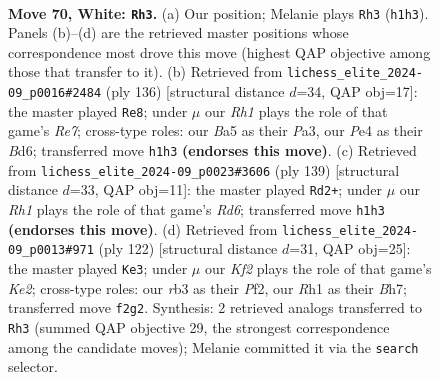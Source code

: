 \documentclass[11pt]{article}
\begin{document}
\clearpage

\begin{figure}[p]\centering
\begin{subfigure}{0.46\textwidth}\centering
\resizebox{\linewidth}{!}{%
\newchessgame
\chessboard[
  setfen={8/6k1/B2p3p/B3p1b1/n3P2p/1r3P2/5K2/7R w - - 9 70},
  showmover=false,
  pgfstyle=straightmove, color=movearrow, markmove={h1-h3}
]}
\caption{}
\end{subfigure}\hfill
\begin{subfigure}{0.46\textwidth}\centering
\resizebox{\linewidth}{!}{%
\newchessgame
\chessboard[
  setfen={8/4R3/3B1pk1/3p4/p2P3r/Pb1K4/8/8 w - - 32 69},
  showmover=false,
  pgfstyle=straightmove, color=movearrow, markmove={e7-e8}
]}
\caption{}
\end{subfigure}
\\[4pt]
\begin{subfigure}{0.46\textwidth}\centering
\resizebox{\linewidth}{!}{%
\newchessgame
\chessboard[
  setfen={8/6pk/5p2/1b6/5BP1/3rPP2/5K2/2R5 b - - 27 70},
  showmover=false,
  pgfstyle=straightmove, color=movearrow, markmove={d3-d2}
]}
\caption{}
\end{subfigure}\hfill
\begin{subfigure}{0.46\textwidth}\centering
\resizebox{\linewidth}{!}{%
\newchessgame
\chessboard[
  setfen={5k2/6pB/4p2p/3b4/4p1PP/8/4KP2/8 w - - 0 62},
  showmover=false,
  pgfstyle=straightmove, color=movearrow, markmove={e2-e3}
]}
\caption{}
\end{subfigure}
\caption{\textbf{Move 70, White: \texttt{Rh3}.} (a) Our position; Melanie plays \texttt{Rh3} (\texttt{h1h3}). Panels (b)--(d) are the retrieved master positions whose correspondence most drove this move (highest QAP objective among those that transfer to it). (b) Retrieved from \texttt{lichess\_elite\_2024-09\_p0016\#2484} (ply 136) [structural distance $d$=34, QAP obj=17]: the master played \texttt{Re8}; under $\mu$ our \emph{Rh1} plays the role of that game's \emph{Re7}; cross-type roles: our \emph{B}a5 as their \emph{P}a3, our \emph{P}e4 as their \emph{B}d6; transferred move \texttt{h1h3} \textbf{(endorses this move)}. (c) Retrieved from \texttt{lichess\_elite\_2024-09\_p0023\#3606} (ply 139) [structural distance $d$=33, QAP obj=11]: the master played \texttt{Rd2+}; under $\mu$ our \emph{Rh1} plays the role of that game's \emph{Rd6}; transferred move \texttt{h1h3} \textbf{(endorses this move)}. (d) Retrieved from \texttt{lichess\_elite\_2024-09\_p0013\#971} (ply 122) [structural distance $d$=31, QAP obj=25]: the master played \texttt{Ke3}; under $\mu$ our \emph{Kf2} plays the role of that game's \emph{Ke2}; cross-type roles: our \emph{r}b3 as their \emph{P}f2, our \emph{R}h1 as their \emph{B}h7; transferred move \texttt{f2g2}. Synthesis: 2 retrieved analogs transferred to \texttt{Rh3} (summed QAP objective 29, the strongest correspondence among the candidate moves); Melanie committed it via the \texttt{search} selector.}
\label{fig:thought-m138}
\end{figure}
\end{document}
